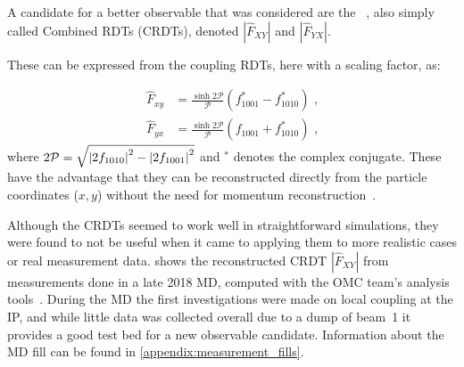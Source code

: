 A candidate for a better observable that was considered are the ~\cite{PRAB:Franchi:First_Simultaneous}, also simply called Combined RDTs (CRDTs), denoted \(|\hat{F}_{XY}|\) and \(|\hat{F}_{YX}|\).
\break

These can be expressed from the coupling \glspl{RDT}, here with a scaling factor, as:

\begin{equation}
    \begin{aligned}
        \hat{F}_{xy} &= \frac{\sinh{2 \mathcal{P}}}{\mathcal{P}} \left( f^{\ast}_{1001} - f^{\ast}_{1010} \right)  \text{ ,} \\
        \hat{F}_{yx} &= \frac{\sinh{2 \mathcal{P}}}{\mathcal{P}} \left( f_{1001} + f^{\ast}_{1010} \right)         \text{ ,}
    \end{aligned}
    \label{equation:combined_coupling_rdts}
\end{equation}
where \(2 \mathcal{P} = \sqrt{\left\lvert 2 f_{1010} \right\rvert^2 - \left\lvert 2 f_{1001} \right\rvert^2}\) and \(^{\ast}\) denotes the complex conjugate.
These have the advantage that they can be reconstructed directly from the particle coordinates (\(x,y\)) without the need for momentum reconstruction~\cite{PRAB:Hofer:Coupling_Local_Observables}.

Although the CRDTs seemed to work well in straightforward simulations, they were found to not be useful when it came to applying them to more realistic cases or real measurement data.
 shows the reconstructed CRDT \(|\hat{F}_{XY}|\) from measurements done in a late \num{2018} \gls{MD}, computed with the \acrshort{OMC} team's analysis tools~\cite{CODE:OMC:omc3}.
During the MD the first investigations were made on local coupling at the IP, and while little data was collected overall due to a dump of beam~\num{1} it provides a good test bed for a new observable candidate.
Information about the MD fill can be found in \cref{appendix:measurement_fills}.

